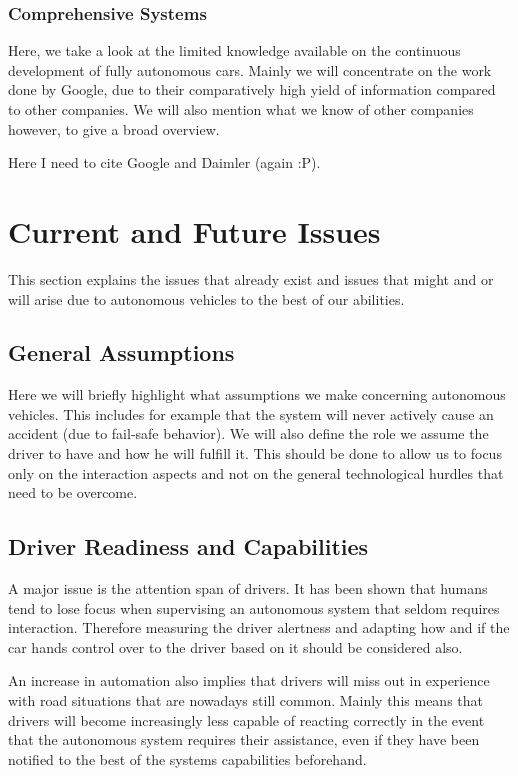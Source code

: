 \documentclass{acm_proc_article-sp}
\begin{document}
\subsubsection{Comprehensive Systems}

Here, we take a look at the limited knowledge available on the continuous development of fully autonomous cars.
Mainly we will concentrate on the work done by Google, due to their comparatively high yield of information compared to other companies.
We will also mention what we know of other companies however, to give a broad overview.

Here I need to cite Google \cite{www:google_car} and Daimler \cite{www:daimler_intelligent_drive} (again :P).

\section{Current and Future Issues}

This section explains the issues that already exist and issues that might and or will arise due to autonomous vehicles to the best of our abilities.

\subsection{General Assumptions}

Here we will briefly highlight what assumptions we make concerning autonomous vehicles.
This includes for example that the system will never actively cause an accident (due to fail-safe behavior).
We will also define the role we assume the driver to have and how he will fulfill it.
This should be done to allow us to focus only on the interaction aspects and not on the general technological hurdles that need to be overcome.

\subsection{Driver Readiness and Capabilities}

A major issue is the attention span of drivers.
It has been shown that humans tend to lose focus when supervising an autonomous system that seldom requires interaction.
Therefore measuring the driver alertness and adapting how and if the car hands control over to the driver based on it should be considered also.

An increase in automation also implies that drivers will miss out in experience with road situations that are nowadays still common.
Mainly this means that drivers will become increasingly less capable of reacting correctly in the event that the autonomous system requires their assistance, even if they have been notified to the best of the systems capabilities beforehand.
\end{document}
